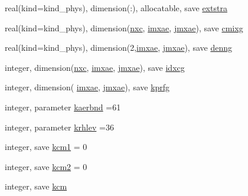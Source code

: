 \begin{DoxyCompactItemize}
\item 
real(kind=kind\+\_\+phys), dimension(\+:), allocatable, save \hyperlink{namespacemodule__radiation__aerosols_ac0c59f22f472671cd86221cc1ed46c60}{extstra}
\item 
real(kind=kind\+\_\+phys), dimension(\hyperlink{namespacemodule__radiation__aerosols_a1fffbb55ad2986a216b721a6c103c4cf}{nxc}, \hyperlink{namespacemodule__radiation__aerosols_a52cda855a397136f75768d205292ddbb}{imxae}, \hyperlink{namespacemodule__radiation__aerosols_afdfdd058364062349b02cec9c712ea80}{jmxae}), save \hyperlink{namespacemodule__radiation__aerosols_a358c83599fb321a59c958e54d9f284d9}{cmixg}
\item 
real(kind=kind\+\_\+phys), dimension(2,\hyperlink{namespacemodule__radiation__aerosols_a52cda855a397136f75768d205292ddbb}{imxae}, \hyperlink{namespacemodule__radiation__aerosols_afdfdd058364062349b02cec9c712ea80}{jmxae}), save \hyperlink{namespacemodule__radiation__aerosols_a0ccc698bc870cb6ccbc1c2b64a3f45f6}{denng}
\item 
integer, dimension(\hyperlink{namespacemodule__radiation__aerosols_a1fffbb55ad2986a216b721a6c103c4cf}{nxc}, \hyperlink{namespacemodule__radiation__aerosols_a52cda855a397136f75768d205292ddbb}{imxae}, \hyperlink{namespacemodule__radiation__aerosols_afdfdd058364062349b02cec9c712ea80}{jmxae}), save \hyperlink{namespacemodule__radiation__aerosols_a4cb38abaf6ece5a0ed717edd6f6b4078}{idxcg}
\item 
integer, dimension(     \hyperlink{namespacemodule__radiation__aerosols_a52cda855a397136f75768d205292ddbb}{imxae}, \hyperlink{namespacemodule__radiation__aerosols_afdfdd058364062349b02cec9c712ea80}{jmxae}), save \hyperlink{namespacemodule__radiation__aerosols_a28df10ba381278cc7474bea0bfdaa870}{kprfg}
\item 
integer, parameter \hyperlink{namespacemodule__radiation__aerosols_ad345c77fc29d8b02de34990162645a66}{kaerbnd} =61
\item 
integer, parameter \hyperlink{namespacemodule__radiation__aerosols_a33f2d4489a1730a27cbdc2e2add0f977}{krhlev} =36
\item 
integer, save \hyperlink{namespacemodule__radiation__aerosols_a92b09dd26cc321af3b5da0b1c310a588}{kcm1} = 0
\item 
integer, save \hyperlink{namespacemodule__radiation__aerosols_ab2be28697a95bcec8d5cd8de7ebd4328}{kcm2} = 0
\item 
integer, save \hyperlink{namespacemodule__radiation__aerosols_a4816bc93b826ff2fad9ff0805ea39fd5}{kcm}
\item 

\end{DoxyCompactItemize}
